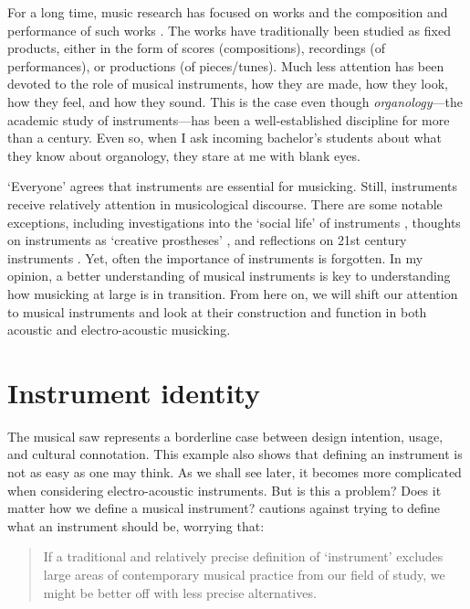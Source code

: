 For a long time, music research has focused on works \citep{goehr_imaginary_1992} and the composition and performance of such works \citep{johnson_musical_1997}. The works have traditionally been studied as fixed products, either in the form of scores (compositions), recordings (of performances), or productions (of pieces/tunes). Much less attention has been devoted to the role of musical instruments, how they are made, how they look, how they feel, and how they sound. This is the case even though \emph{organology}---the academic study of instruments---has been a well-established discipline for more than a century. Even so, when I ask incoming bachelor's students about what they know about organology, they stare at me with blank eyes.

`Everyone' agrees that instruments are essential for musicking. Still, instruments receive relatively attention in musicological discourse. There are some notable exceptions, including investigations into the `social life' of instruments \citep{bates_social_2012}, thoughts on instruments as `creative prostheses' \citep{de_souza_music_2017}, and reflections on 21st century instruments \citep{bovermann_musical_2017}. Yet, often the importance of instruments is forgotten. In my opinion, a better understanding of musical instruments is key to understanding how musicking at large is in transition. From here on, we will shift our attention to musical instruments and look at their construction and function in both acoustic and electro-acoustic musicking.


\section{Instrument identity}

The musical saw represents a borderline case between design intention, usage, and cultural connotation. This example also shows that defining an instrument is not as easy as one may think. As we shall see later, it becomes more complicated when considering electro-acoustic instruments. But is this a problem? Does it matter how we define a musical instrument? \citet{kvifte_what_2008} cautions against trying to define what an instrument should be, worrying that:

\begin{quotation}
If a traditional and relatively precise definition of ‘instrument’ excludes large areas of contemporary musical practice from our field of study, we might be better off with less precise alternatives.
\end{quotation}


